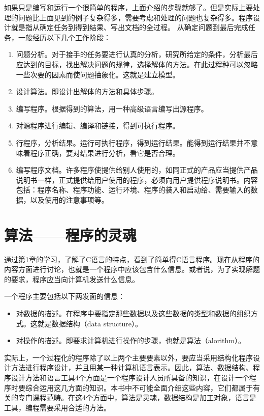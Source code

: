 如果只是编写和运行一个很简单的程序，上面介绍的步骤就够了。但是实际上要处理的问题比上面见到的例子复杂得多，需要考虑和处理的问题也复杂得多。程序设计就是指从确定任务到得到结果、写出文档的全过程。
从确定问题到最后完成任务，一般经历以下几个工作阶段：
\begin{enumerate}
	\item 问题分析。对于接手的任务要进行认真的分析，研究所给定的条件，分析最后应达到的目标，找出解决问题的规律，选择解体的方法。在此过程种可以忽略一些次要的因素而使问题抽象化。这就是建立模型。
	\item 设计算法。即设计出解体的方法和具体步骤。
	\item 编写程序。根据得到的算法，用一种高级语言编写出源程序。
	\item 对源程序进行编辑、编译和链接，得到可执行程序。
	\item 行程序，分析结果。运行可执行程序，得到运行结果。能得到运行结果并不意味着程序正确，要对结果进行分析，看它是否合理。
	\item 编写程序文档。许多程序使提供给别人使用的，如同正式的产品应当提供产品说明书一样，正式提供给用户使用的程序，必须向用户提供程序说明书。内容包括：程序名称、程序功能、运行环境、程序的装入和启动给、需要输入的数据，以及使用的注意事项等。
\end{enumerate}

\chapter{算法——程序的灵魂}

通过第1章的学习，了解了C语言的特点，看到了简单得C语言程序。现在从程序的内容方面进行讨论，也就是一个程序中应该包含什么信息。或者说，为了实现解题的要求，程序应当向计算机发送什么信息。

一个程序主要包括以下两发面的信息：
\begin{itemize}
	\item 对数据的描述。在程序中要指定那些数据以及这些数据的类型和数据的组织方式。这就是数据结构（data structure）。
	\item 对操作的描述。即要求计算机进行操作的步骤，也就是算法（alorithm）。
\end{itemize}

实际上，一个过程化的程序除了以上两个主要要素以外，要应当采用结构化程序设计方法进行程序设计，并且用某一种计算机语言表示。因此，算法、数据结构、程序设计方法和语言工具4个方面是一个程序设计人员所具备的知识，在设计一个程序时要综合运用这几方面的知识。本书中不可能全面介绍这些内容，它们都属于有关的专门课程范畴。在这4个方面中，算法是灵魂，数据结构是加工对象，语言是工具，编程需要采用合适的方法。

